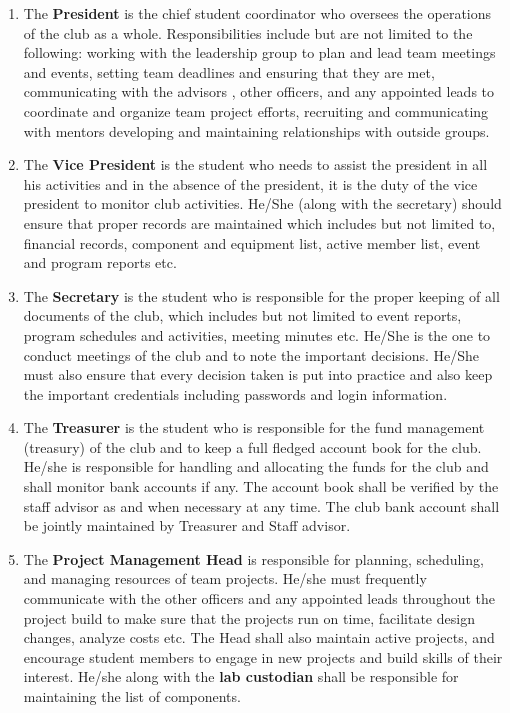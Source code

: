 \begin{enumerate}
	\item The \textbf{President} is the chief student coordinator who oversees the operations of the club as a whole. Responsibilities include but are not limited to the following: working with the leadership group to plan and lead team meetings and events, setting team deadlines and ensuring that they are met, communicating with the advisors , other officers, and any appointed leads to coordinate and organize team project efforts, recruiting and communicating with mentors developing and maintaining relationships with outside groups. 
	
	\item The \textbf{Vice President} is the student who needs to assist the president in all his activities and in the absence of the president, it is the duty of the vice president to monitor club activities. He/She (along with the secretary) should ensure that proper records are maintained which includes but not limited to, financial records, component and equipment list, active member list, event and program reports etc.
	
	\item The \textbf{Secretary} is the student who is responsible for the proper keeping of all documents of the club, which includes but not limited to event reports, program schedules and activities, meeting minutes etc. He/She is the one to conduct meetings of the club and to note the important decisions. He/She must also ensure that every decision taken is put into practice and also keep the important credentials including passwords and login information.
	
	\item The \textbf{Treasurer} is the student who is responsible for the fund management (treasury) of the club and to keep a full fledged account book for the club. He/she is responsible for handling and allocating the funds for the club and shall monitor bank accounts if any. The account book shall be verified by the staff advisor as and when necessary at any time. The club bank account shall be jointly maintained by Treasurer and Staff advisor.
	
	\item The \textbf{Project Management Head} is responsible for planning, scheduling, and managing resources of team projects. He/she must frequently communicate with the other officers and any appointed leads throughout the project build to make sure that the projects run on time, facilitate design changes, analyze costs etc. The Head shall also maintain active projects, and encourage student members to engage in new projects and build skills of their interest. He/she along with the \textbf{lab custodian} shall be responsible for maintaining the list of components.
	

\end{enumerate}
